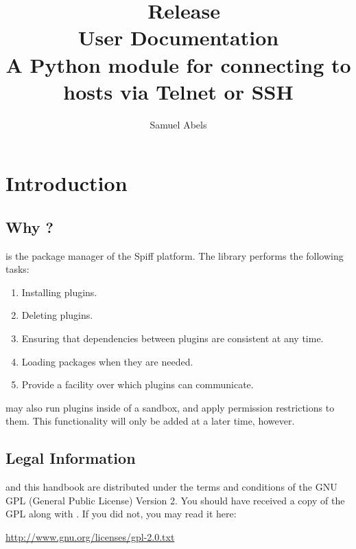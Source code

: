 \title{\productname\ Release \productversion\\
User Documentation\\
\vspace{5 mm}
\large A Python module for connecting to hosts via Telnet or SSH}
\author{Samuel Abels}


\maketitle
\tableofcontents

\newpage
\section{Introduction}
\subsection{Why \productname?}

\product is the package manager of the Spiff platform.
The library performs the following tasks:

\begin{enumerate}
\item Installing plugins.
\item Deleting plugins.
\item Ensuring that dependencies between plugins are consistent at any time.
\item Loading packages when they are needed.
\item Provide a facility over which plugins can communicate.
\end{enumerate}

\product may also run plugins inside of a sandbox, and apply
permission restrictions to them. This functionality will only be added
at a later time, however.


\subsection{Legal Information}

\product and this handbook are distributed under the terms and conditions 
of the GNU GPL (General Public License) Version 2. You should have received 
a copy of the GPL along with \product. If you did not, you may read it here:

\vspace{1em}
\url{http://www.gnu.org/licenses/gpl-2.0.txt}
\vspace{1em}

